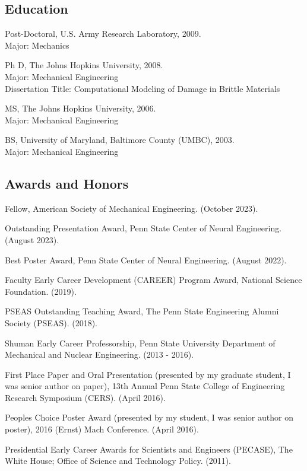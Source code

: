 \documentclass[
]{article}
\begin{document}
\subsection{Education}\label{education}

Post-Doctoral, U.S. Army Research Laboratory, 2009.\\
Major: Mechanics

Ph D, The Johns Hopkins University, 2008.\\
Major: Mechanical Engineering\\
Dissertation Title: Computational Modeling of Damage in Brittle
Materials

MS, The Johns Hopkins University, 2006.\\
Major: Mechanical Engineering

BS, University of Maryland, Baltimore County (UMBC), 2003.\\
Major: Mechanical Engineering

\subsection{Awards and Honors}\label{awards-and-honors}

Fellow, American Society of Mechanical Engineering. (October 2023).

Outstanding Presentation Award, Penn State Center of Neural Engineering.
(August 2023).

Best Poster Award, Penn State Center of Neural Engineering. (August
2022).

Faculty Early Career Development (CAREER) Program Award, National
Science Foundation. (2019).

PSEAS Outstanding Teaching Award, The Penn State Engineering Alumni
Society (PSEAS). (2018).

Shuman Early Career Professorship, Penn State University Department of
Mechanical and Nuclear Engineering. (2013 - 2016).

First Place Paper and Oral Presentation (presented by my graduate
student, I was senior author on paper), 13th Annual Penn State College
of Engineering Research Symposium (CERS). (April 2016).

People\textquotesingle s Choice Poster Award (presented by my student, I
was senior author on poster), 2016 (Ernst) Mach Conference. (April
2016).

Presidential Early Career Awards for Scientists and Engineers (PECASE),
The White House; Office of Science and Technology Policy. (2011).
\end{document}
